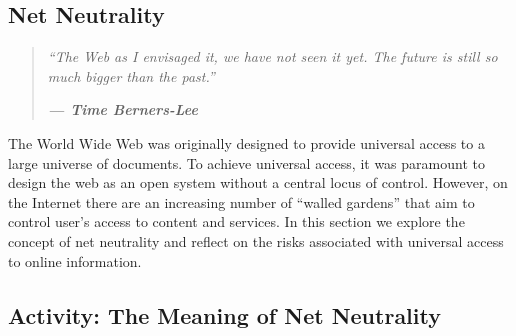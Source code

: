 \documentclass[
]{book}
\theoremstyle{definition}
\theoremstyle{definition}
\theoremstyle{definition}
\theoremstyle{definition}
\theoremstyle{remark}
\begin{document}
\hypertarget{net-neutrality}{%
\subsection*{Net Neutrality}\label{net-neutrality}}

\begin{quote}
\emph{``The Web as I envisaged it, we have not seen it yet. The future is still so much bigger than the past.''}

\textbf{\emph{--- Time Berners-Lee}}
\end{quote}

The World Wide Web was originally designed to provide universal access to a large universe of documents. To achieve universal access, it was paramount to design the web as an open system without a central locus of control. However, on the Internet there are an increasing number of ``walled gardens'' that aim to control user's access to content and services. In this section we explore the concept of net neutrality and reflect on the risks associated with universal access to online information.

\hypertarget{activity-the-meaning-of-net-neutrality}{%
\subsection*{Activity: The Meaning of Net Neutrality}\label{activity-the-meaning-of-net-neutrality}}
\end{document}
